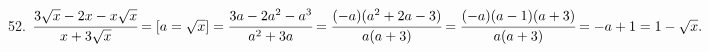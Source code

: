 52. $\cfrac{3\sqrt{x}-2x-x\sqrt{x}}{x+3\sqrt{x}}=[a=\sqrt{x}]=
\cfrac{3a-2a^2-a^3}{a^2+3a}=\cfrac{(-a)(a^2+2a-3)}{a(a+3)}=\cfrac{(-a)(a-1)(a+3)}{a(a+3)}=-a+1=1-\sqrt{x}.$\\
